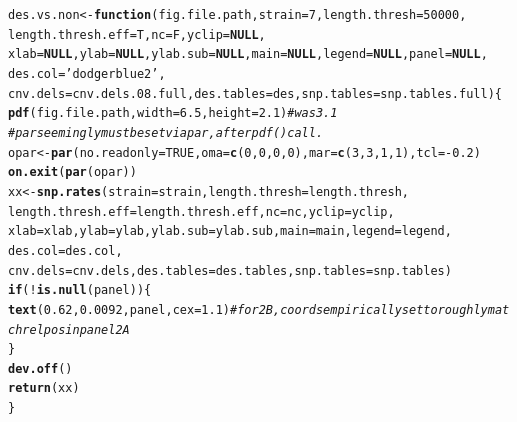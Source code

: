 \documentclass{article}\usepackage[]{graphicx}\usepackage[]{color}
\makeatletter
\newcommand{\hlnum}[1]{\textcolor[rgb]{0.686,0.059,0.569}{#1}}%
\newcommand{\hlstr}[1]{\textcolor[rgb]{0.192,0.494,0.8}{#1}}%
\newcommand{\hlcom}[1]{\textcolor[rgb]{0.678,0.584,0.686}{\textit{#1}}}%
\newcommand{\hlopt}[1]{\textcolor[rgb]{0,0,0}{#1}}%
\newcommand{\hlstd}[1]{\textcolor[rgb]{0.345,0.345,0.345}{#1}}%
\newcommand{\hlkwa}[1]{\textcolor[rgb]{0.161,0.373,0.58}{\textbf{#1}}}%
\newcommand{\hlkwb}[1]{\textcolor[rgb]{0.69,0.353,0.396}{#1}}%
\newcommand{\hlkwc}[1]{\textcolor[rgb]{0.333,0.667,0.333}{#1}}%
\newcommand{\hlkwd}[1]{\textcolor[rgb]{0.737,0.353,0.396}{\textbf{#1}}}%
\newenvironment{kframe}{%
 \def\at@end@of@kframe{}%
 \ifinner\ifhmode%
  \def\at@end@of@kframe{\end{minipage}}%
  \begin{minipage}{\columnwidth}%
 \fi\fi%
 \def\FrameCommand##1{\hskip\@totalleftmargin \hskip-\fboxsep
 \colorbox{shadecolor}{##1}\hskip-\fboxsep
     \hskip-\linewidth \hskip-\@totalleftmargin \hskip\columnwidth}%
 \MakeFramed {\advance\hsize-\width
   \@totalleftmargin\z@ \linewidth\hsize
   \@setminipage}}%
 {\par\unskip\endMakeFramed%
 \at@end@of@kframe}
\newenvironment{knitrout}{}{} %
\makeatother
\begin{document}
\begin{knitrout}\footnotesize
{}\color{fgcolor}\begin{kframe}
\begin{alltt}
  \hlstd{des.vs.non} \hlkwb{<-} \hlkwa{function}\hlstd{(}\hlkwc{fig.file.path}\hlstd{,} \hlkwc{strain}\hlstd{=}\hlnum{7}\hlstd{,} \hlkwc{length.thresh}\hlstd{=}\hlnum{50000}\hlstd{,}
                         \hlkwc{length.thresh.eff}\hlstd{=T,} \hlkwc{nc}\hlstd{=F,} \hlkwc{yclip}\hlstd{=}\hlkwa{NULL}\hlstd{,}
                         \hlkwc{xlab}\hlstd{=}\hlkwa{NULL}\hlstd{,} \hlkwc{ylab}\hlstd{=}\hlkwa{NULL}\hlstd{,} \hlkwc{ylab.sub}\hlstd{=}\hlkwa{NULL}\hlstd{,} \hlkwc{main}\hlstd{=}\hlkwa{NULL}\hlstd{,} \hlkwc{legend}\hlstd{=}\hlkwa{NULL}\hlstd{,} \hlkwc{panel}\hlstd{=}\hlkwa{NULL}\hlstd{,}
                         \hlkwc{des.col}\hlstd{=}\hlstr{'dodgerblue2'}\hlstd{,}
                         \hlkwc{cnv.dels}\hlstd{=cnv.dels.08.full,} \hlkwc{des.tables}\hlstd{=des,} \hlkwc{snp.tables}\hlstd{=snp.tables.full)\{}
    \hlkwd{pdf}\hlstd{(fig.file.path,}\hlkwc{width}\hlstd{=}\hlnum{6.5}\hlstd{,} \hlkwc{height}\hlstd{=}\hlnum{2.1}\hlstd{)} \hlcom{# was 3.1}
    \hlcom{# par seemingly must be set via par, after pdf() call.}
    \hlstd{opar} \hlkwb{<-} \hlkwd{par}\hlstd{(}\hlkwc{no.readonly}\hlstd{=}\hlnum{TRUE}\hlstd{,}\hlkwc{oma}\hlstd{=}\hlkwd{c}\hlstd{(}\hlnum{0}\hlstd{,}\hlnum{0}\hlstd{,}\hlnum{0}\hlstd{,}\hlnum{0}\hlstd{),}\hlkwc{mar}\hlstd{=}\hlkwd{c}\hlstd{(}\hlnum{3}\hlstd{,}\hlnum{3}\hlstd{,}\hlnum{1}\hlstd{,}\hlnum{1}\hlstd{),}\hlkwc{tcl}\hlstd{=}\hlopt{-}\hlnum{0.2}\hlstd{)}
    \hlkwd{on.exit}\hlstd{(}\hlkwd{par}\hlstd{(opar))}
    \hlstd{xx} \hlkwb{<-} \hlkwd{snp.rates}\hlstd{(}\hlkwc{strain}\hlstd{=strain,} \hlkwc{length.thresh}\hlstd{=length.thresh,}
                    \hlkwc{length.thresh.eff}\hlstd{=length.thresh.eff,} \hlkwc{nc}\hlstd{=nc,} \hlkwc{yclip}\hlstd{=yclip,}
                    \hlkwc{xlab}\hlstd{=xlab,} \hlkwc{ylab}\hlstd{=ylab,} \hlkwc{ylab.sub}\hlstd{=ylab.sub,} \hlkwc{main}\hlstd{=main,} \hlkwc{legend}\hlstd{=legend,}
                    \hlkwc{des.col}\hlstd{=des.col,}
                    \hlkwc{cnv.dels}\hlstd{=cnv.dels,} \hlkwc{des.tables}\hlstd{=des.tables,} \hlkwc{snp.tables}\hlstd{=snp.tables)}
    \hlkwa{if}\hlstd{(}\hlopt{!}\hlkwd{is.null}\hlstd{(panel))\{}
      \hlkwd{text}\hlstd{(}\hlnum{0.62}\hlstd{,}\hlnum{0.0092}\hlstd{,panel,}\hlkwc{cex}\hlstd{=}\hlnum{1.1}\hlstd{)} \hlcom{# for 2B, coords empirically set to roughly match rel pos in panel 2A}
    \hlstd{\}}
    \hlkwd{dev.off}\hlstd{()}
    \hlkwd{return}\hlstd{(xx)}
  \hlstd{\}}
\end{alltt}
\end{kframe}
\end{knitrout}
\end{document}
